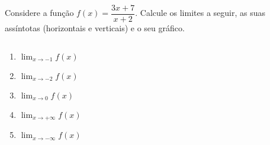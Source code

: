 \begin{frame}
  \begin{example}
    Considere a função $f(x) = \dfrac{3x+7}{x+2}$. Calcule os limites a seguir, as suas assíntotas (horizontais e verticais) e o seu gráfico.
  \end{example}
  \begin{columns}[onlytextwidth]
    \begin{column}{0.4\textwidth}
      \begin{enumerate}
        \item<only@1> $\displaystyle\lim_{x\rightarrow -1}f(x)$
        \item<only@1> $\displaystyle\lim_{x\rightarrow -2}f(x)$
        \item<only@1> $\displaystyle\lim_{x\rightarrow 0}f(x)$
        \item<only@1> $\displaystyle\lim_{x\rightarrow +\infty}f(x)$
        \item<only@1> $\displaystyle\lim_{x\rightarrow -\infty}f(x)$
      \end{enumerate}
    \end{column}
    \begin{column}{0.6\textwidth}\vspace{-0.5cm}
      \begin{figure}
      \end{figure}
    \end{column}
  \end{columns}
\end{frame}
